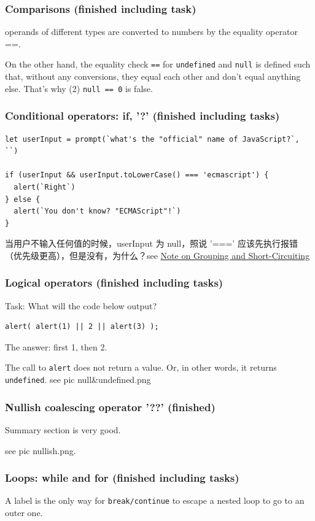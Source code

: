 \documentclass[a4paper, 12pt]{article}
\begin{document}
\subsubsection{Comparisons (finished including task)}
operands of different types are converted to numbers by the equality operator ==.

On the other hand, the equality check \verb|==| for \verb|undefined| and \verb|null| is defined such that, without any conversions, they equal each other and don't equal anything else. That's why (2) \verb|null == 0| is false.

\subsubsection{Conditional operators: if, '?' (finished including tasks)}
\begin{verbatim}
let userInput = prompt(`what's the "official" name of JavaScript?`, ``)

if (userInput && userInput.toLowerCase() === 'ecmascript') {
  alert(`Right`)
} else {
  alert(`You don't know? "ECMAScript"!`)
}
\end{verbatim}
当用户不输入任何值的时候，userInput 为 null，照说 '===' 应该先执行报错（优先级更高），但是没有，为什么？see \href{https://developer.mozilla.org/en-US/docs/Web/JavaScript/Reference/Operators/Operator_Precedence#Note_on_grouping_and_short-circuiting}{Note on Grouping and Short-Circuiting}

\subsubsection{Logical operators (finished including tasks)}
Task: What will the code below output?
\begin{verbatim}
alert( alert(1) || 2 || alert(3) );
\end{verbatim}
The answer: first 1, then 2.

The call to \verb|alert| does not return a value. Or, in other words, it returns \verb|undefined|. see pic null\&undefined.png

\subsubsection{Nullish coalescing operator '??' (finished)}
Summary section is very good.

see pic nullish.png.

\subsubsection{Loops: while and for (finished including tasks)}
A label is the only way for \verb|break/continue| to escape a nested loop to go to an outer one.
\end{document}
